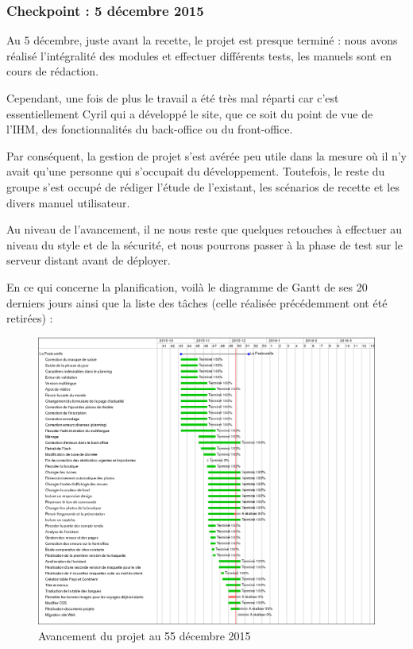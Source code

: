 \documentclass[11pt]{report}
\begin{document}
\subsubsection*{Checkpoint : 5 décembre 2015}
\par Au 5 décembre, juste avant la recette, le projet est presque terminé : nous
avons réalisé l'intégralité des modules et effectuer différents tests, les
manuels sont en cours de rédaction. \\
\par Cependant, une fois de plus le travail a été très mal réparti car c'est
essentiellement Cyril qui a développé le site, que ce soit du point de vue de
l'IHM, des fonctionnalités du back-office ou du front-office. \\
\par Par conséquent, la gestion de projet s'est avérée peu utile dans la mesure
où il n'y avait qu'une personne qui s'occupait du développement. Toutefois, le
reste du groupe s'est occupé de rédiger l'étude de l'existant, les scénarios de
recette et les divers manuel utilisateur.\\
\par Au niveau de l'avancement, il ne nous reste que quelques retouches à
effectuer au niveau du style et de la sécurité, et nous pourrons passer à la
phase de test sur le serveur distant avant de déployer.\\
\par En ce qui concerne la planification, voilà le diagramme de Gantt de ses 20
derniers jours ainsi que la liste des tâches (celle réalisée précédemment ont
été retirées) :


\begin{landscape}
\begin{figure}[t]
    \caption{Avancement du projet au 55 décembre 2015}
   \includegraphics[scale=0.5]{include/gantt5-12.png}
\end{figure}
\end{landscape}
\end{document}
